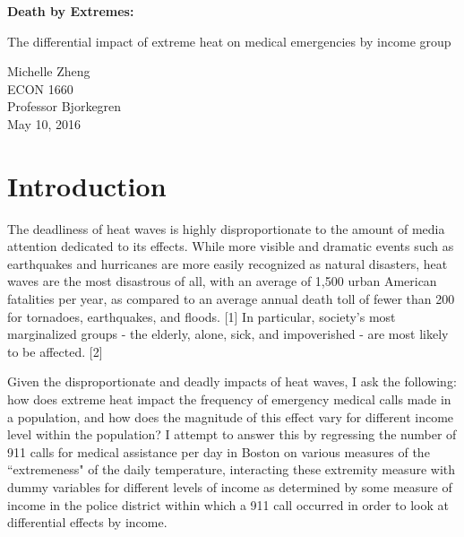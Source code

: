 \documentclass[11pt, oneside]{article}      %
\begin{document}
\begin{titlepage}
    \begin{center}
        \vspace*{1cm}
        
        \Huge
        \textbf{Death by Extremes:}
        
        \vspace{0.5cm}
        \large
        The differential impact of extreme heat on medical emergencies by income group \\
        
        
        
        \vfill
        
        \large
        Michelle Zheng \\
        ECON 1660\\
        Professor Bjorkegren\\
        May 10, 2016\\
        \vspace{0.8cm}
        
    \end{center}
\end{titlepage}


\section{Introduction}
The deadliness of heat waves is highly disproportionate to the amount of media attention dedicated to its effects. While more visible and dramatic events such as earthquakes and hurricanes are more easily recognized as natural disasters, heat waves are the most disastrous of all, with an average of 1,500 urban American fatalities per year, as compared to an average annual death toll of fewer than 200 for tornadoes, earthquakes, and floods. [1] In particular, society's most marginalized groups - the elderly, alone, sick, and impoverished - are most likely to be affected. [2]

Given the disproportionate and deadly impacts of heat waves, I ask the following: how does extreme heat impact the frequency of emergency medical calls made in a population, and how does the magnitude of this effect vary for different income level within the population? I attempt to answer this by regressing the number of 911 calls for medical assistance per day in Boston on various measures of the ``extremeness" of the daily temperature, interacting these extremity measure with dummy variables for different levels of income as determined by some measure of income in the police district within which a 911 call occurred in order to look at differential effects by income.
\end{document}
